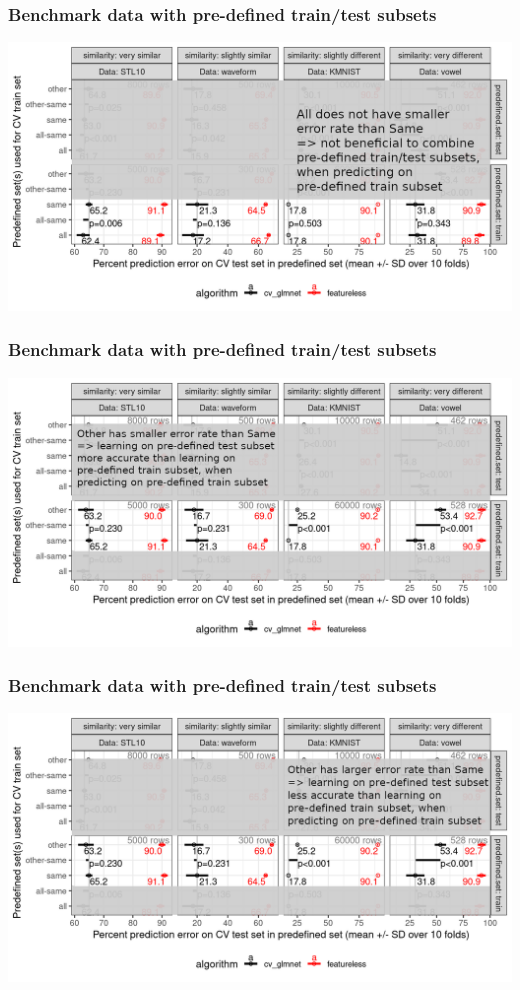 \documentclass[t]{beamer}
\begin{document}
\begin{frame}
  \frametitle{Benchmark data with pre-defined train/test subsets}
  \includegraphics[width=\textwidth]{data_Classif_batchmark_registry_glmnet_featureless_mean_sd_different_all_train}
\end{frame}

\begin{frame}
  \frametitle{Benchmark data with pre-defined train/test subsets}
  \includegraphics[width=\textwidth]{data_Classif_batchmark_registry_glmnet_featureless_mean_sd_other_similar_train}
\end{frame}

\begin{frame}
  \frametitle{Benchmark data with pre-defined train/test subsets}
  \includegraphics[width=\textwidth]{data_Classif_batchmark_registry_glmnet_featureless_mean_sd_other_different_train}
\end{frame}
\end{document}
